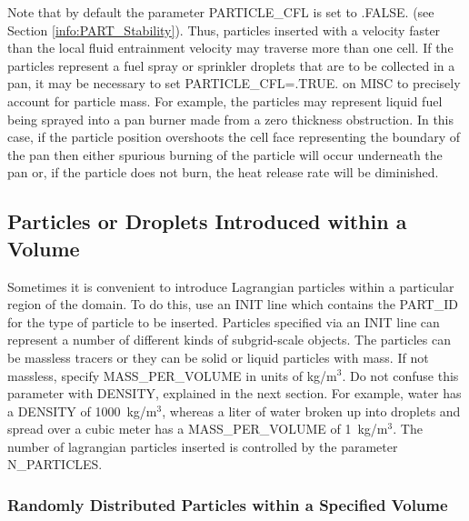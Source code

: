 \documentclass[11pt]{book}
\begin{document}
Note that by default the parameter {\ct PARTICLE\_CFL} is set to {\ct .FALSE.} (see Section \ref{info:PART_Stability}).  Thus, particles inserted with a velocity faster than the local fluid entrainment velocity may traverse more than one cell.  If the particles represent a fuel spray or sprinkler droplets that are to be collected in a pan, it may be necessary to set {\ct PARTICLE\_CFL=.TRUE.} on {\ct MISC} to precisely account for particle mass.  For example, the particles may represent liquid fuel being sprayed into a pan burner made from a zero thickness obstruction.  In this case, if the particle position overshoots the cell face representing the boundary of the pan then either spurious burning of the particle will occur underneath the pan or, if the particle does not burn, the heat release rate will be diminished.


\subsection{Particles or Droplets Introduced within a Volume}
\label{info:initial_droplets}

Sometimes it is convenient to introduce Lagrangian particles within a particular region of the domain. To do this, use an {\ct INIT} line which contains the {\ct PART\_ID} for the type of particle to be inserted. Particles specified via an {\ct INIT} line can represent a number of different kinds of subgrid-scale objects. The particles can be massless tracers or they can be solid or liquid particles with mass. If not massless, specify {\ct MASS\_PER\_VOLUME} in units of kg/m$^3$. Do not confuse this parameter with {\ct DENSITY}, explained in the next section.
For example, water has a {\ct DENSITY} of 1000~kg/m$^3$, whereas a liter of water broken up into droplets and spread over a cubic meter has a {\ct MASS\_PER\_VOLUME} of 1~kg/m$^3$. The number of lagrangian particles inserted is controlled by the parameter {\ct N\_PARTICLES}.

\subsubsection{Randomly Distributed Particles within a Specified Volume}
\end{document}
